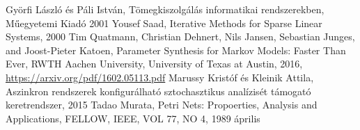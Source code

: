 
\begin{thebibliography}{widestlabel}
	 Györfi László és Páli István, Tömegkiszolgálás informatikai rendszerekben, Műegyetemi Kiadó 2001
	 Yousef Saad, Iterative Methods for Sparse Linear Systems, 2000
	 Tim Quatmann, Christian Dehnert, Nils Jansen,	Sebastian Junges, and Joost-Pieter Katoen, Parameter Synthesis for Markov Models: Faster Than Ever, RWTH Aachen University, University of Texas at Austin, 2016, \url{https://arxiv.org/pdf/1602.05113.pdf}
	 Marussy Kristóf és Kleinik Attila, Aszinkron rendszerek konfigurálható sztochasztikus analízisét támogató keretrendszer, 2015
	 Tadao Murata, Petri Nets: Propoerties, Analysis and Applications, FELLOW, IEEE, VOL 77, NO 4, 1989 április
\end{thebibliography}